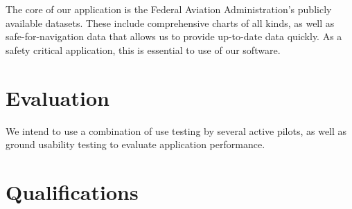 \documentclass[10pt,a4paper]{report}
\begin{document}
The core of our application is the Federal Aviation Administration's publicly available datasets. These include comprehensive charts of all kinds, as well as safe-for-navigation data that allows us to provide up-to-date data quickly. As a safety critical application, this is essential to use of our software.

\section{Evaluation}
We intend to use a combination of use testing by several active pilots, as well as ground usability testing to evaluate application performance. 

\section{Qualifications}
\end{document}
